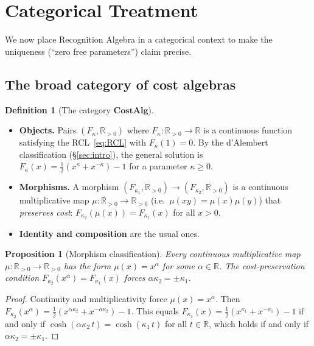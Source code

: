 \documentclass[11pt,a4paper]{article}
\theoremstyle{plain}
\newtheorem{proposition}[theorem]{Proposition}
\theoremstyle{definition}
\newtheorem{definition}[theorem]{Definition}
\theoremstyle{remark}
\newcommand{\RR}{\mathbb{R}}
\begin{document}
\section{Categorical Treatment}\label{sec:category}

We now place Recognition Algebra in a categorical context to make the
uniqueness (``zero free parameters'') claim precise.

\subsection{The broad category of cost algebras}

\begin{definition}[The category $\mathbf{CostAlg}$]\label{def:costcat}
\begin{itemize}[nosep]
\item \textbf{Objects.}  Pairs $(F_\kappa,\RR_{>0})$ where
  $F_\kappa:\RR_{>0}\to\RR$ is a continuous function satisfying
  the RCL~\eqref{eq:RCL} with $F_\kappa(1)=0$.  By the d'Alembert
  classification (\S\ref{sec:intro}), the general solution is
  $F_\kappa(x)=\tfrac12(x^\kappa+x^{-\kappa})-1$ for a parameter
  $\kappa\ge0$.
\item \textbf{Morphisms.}  A morphism
  $(F_{\kappa_1},\RR_{>0})\to(F_{\kappa_2},\RR_{>0})$ is a
  continuous multiplicative map $\mu:\RR_{>0}\to\RR_{>0}$
  (i.e.\ $\mu(xy)=\mu(x)\mu(y)$) that \emph{preserves cost}:
  $F_{\kappa_2}(\mu(x))=F_{\kappa_1}(x)$ for all $x>0$.
\item \textbf{Identity and composition} are the usual ones.
\end{itemize}
\end{definition}

\begin{proposition}[Morphism classification]\label{prop:morph}
Every continuous multiplicative map $\mu:\RR_{>0}\to\RR_{>0}$ has
the form $\mu(x)=x^\alpha$ for some $\alpha\in\RR$.  The
cost-preservation condition
$F_{\kappa_2}(x^\alpha)=F_{\kappa_1}(x)$ forces
$\alpha\kappa_2=\pm\kappa_1$.
\end{proposition}

\begin{proof}
Continuity and multiplicativity force $\mu(x)=x^\alpha$.  Then
$F_{\kappa_2}(x^\alpha)
=\tfrac12(x^{\alpha\kappa_2}+x^{-\alpha\kappa_2})-1$.
This equals
$F_{\kappa_1}(x)=\tfrac12(x^{\kappa_1}+x^{-\kappa_1})-1$
if and only if $\cosh(\alpha\kappa_2\, t)=\cosh(\kappa_1\, t)$ for
all $t\in\RR$, which holds if and only if
$\alpha\kappa_2=\pm\kappa_1$.
\end{proof}
\end{document}
